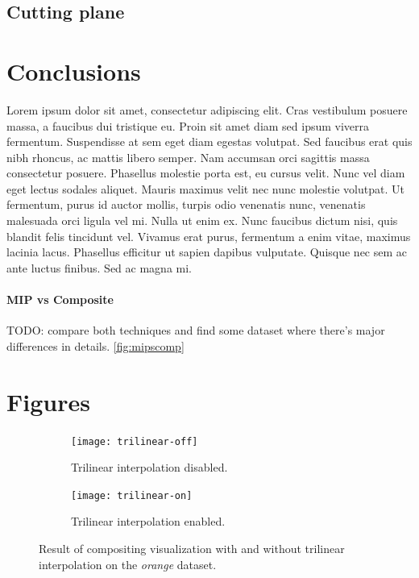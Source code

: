 \documentclass[a4paper]{article}
\begin{document}
\subsection{Cutting plane}

\section{Conclusions}

Lorem ipsum dolor sit amet, consectetur adipiscing elit. Cras vestibulum posuere massa, a faucibus dui tristique eu. Proin sit amet diam sed ipsum viverra fermentum. Suspendisse at sem eget diam egestas volutpat. Sed faucibus erat quis nibh rhoncus, ac mattis libero semper. Nam accumsan orci sagittis massa consectetur posuere. Phasellus molestie porta est, eu cursus velit. Nunc vel diam eget lectus sodales aliquet. Mauris maximus velit nec nunc molestie volutpat. Ut fermentum, purus id auctor mollis, turpis odio venenatis nunc, venenatis malesuada orci ligula vel mi. Nulla ut enim ex. Nunc faucibus dictum nisi, quis blandit felis tincidunt vel. Vivamus erat purus, fermentum a enim vitae, maximus lacinia lacus. Phasellus efficitur ut sapien dapibus vulputate. Quisque nec sem ac ante luctus finibus. Sed ac magna mi.

\paragraph{MIP vs Composite}

TODO: compare both techniques and find some dataset where there's major differences in details. \autoref{fig:mipscomp}




\pagebreak
\appendix
\section{Figures}

\begin{figure}[h]
  \centering
  \begin{subfigure}[b]{0.45\textwidth}
    \centering
    \texttt{[image: trilinear-off]}
    \caption{Trilinear interpolation disabled.}
  \end{subfigure}
  \hfill
  \begin{subfigure}[b]{0.45\textwidth}
    \centering
    \texttt{[image: trilinear-on]}
    \caption{Trilinear interpolation enabled.}
  \end{subfigure}
  \caption{Result of compositing visualization with and without trilinear interpolation on the \textit{orange} dataset.}
  \label{fig:trilinear}
\end{figure}
\end{document}
